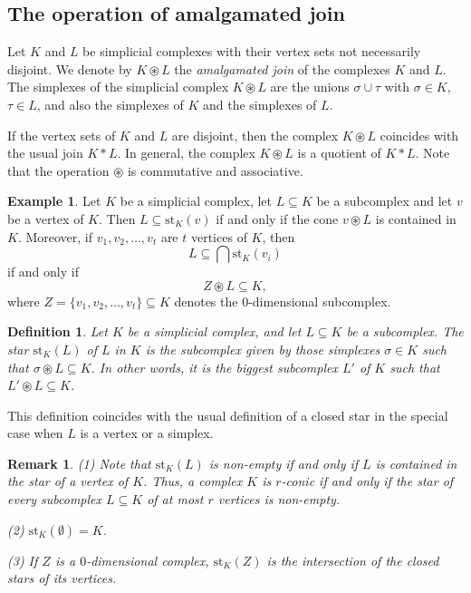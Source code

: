 \documentclass[11pt,twoside, reqno]{amsart}
\theoremstyle{plain}
\newtheorem{remark}[lema]{Remark}
\theoremstyle{definition}
\newtheorem{defi}[lema]{Definition}
\newtheorem{ej}[lema]{Example}
\newcommand{\st}{\textrm{st}}
\begin{document}
\subsection{The operation of amalgamated join} 
Let $K$ and $L$ be simplicial complexes with their vertex sets not necessarily disjoint. We denote by $K \circledast L$ the \textit{amalgamated join} of the complexes $K$ and $L$. The simplexes of the simplicial complex $K \circledast L$ are the unions $\sigma \cup \tau$ with $\sigma \in K$, $\tau \in L$, and also the simplexes of $K$ and the simplexes of $L$. 

If the vertex sets of $K$ and $L$ are disjoint, then the complex $K \circledast L$ coincides with the usual join $K *L$. 
In general, the complex $K\circledast L$ is a quotient of $K*L$. Note that the operation $\circledast$ is commutative and associative.

\begin{ej}\label{ex4}
Let $K$ be a simplicial complex, let $L\subseteq K$ be a subcomplex and let $v$ be a vertex of $K$. Then $L \subseteq \st_K (v)$ if and only if the cone $v\circledast L $ is contained in $K$. Moreover, if $v_1, v_2, \ldots, v_t$ are $t$ vertices of $K$, then $$L\subseteq \bigcap \st_K(v_i)$$ if and only if $$Z \circledast L \subseteq K,$$ where $Z=\{v_1,v_2,\ldots, v_t\}\subseteq K$ denotes the 0-dimensional subcomplex.
\end{ej}

\begin{defi}{\it 
Let $K$ be a simplicial complex, and let $L\subseteq K$ be a subcomplex. The \textit{star} $\st_K(L)$ of $L$ in $K$ is the subcomplex given by those simplexes $\sigma \in K$ such that $\sigma \circledast L\subseteq K$. In other words, it is the biggest subcomplex $L'$ of $K$ such that $L'\circledast L\subseteq K$. 
}\end{defi}

This definition coincides with the usual definition of a closed star in the special case when $L$ is a vertex or a simplex. 

\begin{remark}{\rm 
(1) Note that $\st_K (L)$ is non-empty if and only if $L$ is contained in the star of a vertex of $K$. Thus, a complex $K$ is $r$-conic if and only if the star of every subcomplex $L\subseteq K$ of at most $r$ vertices is non-empty. 

(2) $\st_K(\emptyset)=K$. 

(3) If $Z$ is a $0$-dimensional complex, $\st_K(Z)$ is the intersection of the closed stars of its vertices.}
\end{remark}
\end{document}
